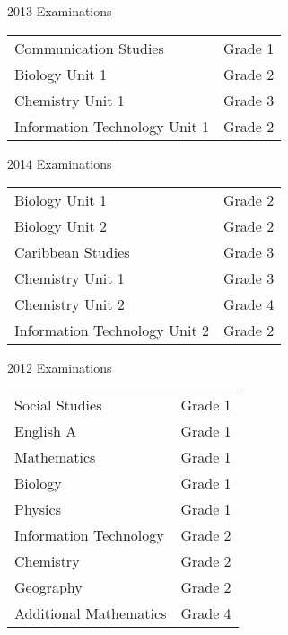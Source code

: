 
 
2013 Examinations

\medskip
\begin{tabular}{ l c }
Communication Studies & Grade 1\\
Biology Unit 1 & Grade 2\\
Chemistry Unit 1 & Grade 3\\
Information Technology Unit 1 & Grade 2
\end{tabular}
\medskip

2014 Examinations

\medskip
\begin{tabular}{ l c }
Biology Unit 1 &  Grade 2\\
Biology Unit 2 & Grade 2\\
Caribbean Studies & Grade 3\\
Chemistry Unit 1 & Grade 3\\
Chemistry Unit 2 & Grade 4\\
Information Technology Unit 2 & Grade 2 
\end{tabular}

\divider

2012 Examinations

\medskip
\begin{tabular}{ l c }
Social Studies & Grade 1\\
English A & Grade 1\\
Mathematics & Grade 1\\
Biology & Grade 1\\
Physics & Grade 1\\
Information Technology &  Grade 2\\
Chemistry & Grade 2\\
Geography & Grade 2\\
Additional Mathematics & Grade 4\\

\end{tabular}
 
 
 

